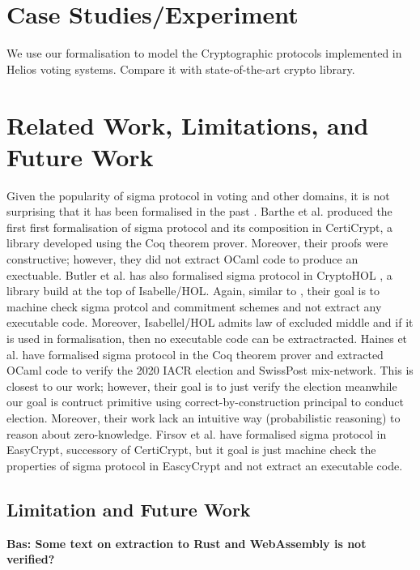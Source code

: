 \documentclass[conference,compsoc]{IEEEtran}
\begin{document}
\section{Case Studies/Experiment}
  We use our formalisation to model the Cryptographic protocols implemented in 
  Helios voting systems. Compare it with state-of-the-art 
  crypto library. 


\section{Related Work, Limitations, and Future Work}
  Given the popularity of sigma protocol in voting 
  and other domains, it is not surprising that it has 
  been formalised in the past \cite{5552642,9519460,
  butler2021formalising,10.1145/3319535.3354247,287095,almeida2010certifying,10221929,
  10.1145/3594735}. Barthe et al. \cite{5552642}  produced the 
  first first formalisation of sigma protocol and its composition in 
  CertiCrypt, a library developed using the Coq theorem prover. 
  Moreover, their proofs were constructive; however, they 
  did not extract OCaml code to produce an exectuable. 
  Butler et al. \cite{ butler2021formalising} has also 
  formalised sigma protocol in CryptoHOL \cite{10.1007/978-3-662-49498-1_20}, a library 
  build at the top of Isabelle/HOL. Again, similar to  \cite{5552642}, 
  their goal is to machine check sigma protcol and commitment schemes 
  and not extract any executable code. Moreover, Isabellel/HOL admits 
  law of excluded middle and if it is used in formalisation, 
  then no executable code can be extractracted. Haines et al. 
  \cite{287095,10.1145/3319535.3354247} have formalised 
  sigma protocol in the Coq theorem prover and extracted OCaml code 
  to verify the 2020 IACR election and SwissPost mix-network. This is 
  closest to our work; however, their goal is to just verify the 
  election meanwhile our goal is contruct primitive using 
  correct-by-construction principal to conduct election. Moreover, 
  their work lack an intuitive way (probabilistic reasoning) 
  to reason about zero-knowledge. Firsov et al. \cite{10221929}
  have formalised sigma protocol in EasyCrypt, successory 
  of CertiCrypt, but it goal is just machine check 
  the properties of sigma protocol in EascyCrypt 
  and not extract an executable code. 

  
  \subsection{Limitation and Future Work}
   \textbf{Bas: Some text on extraction to Rust and WebAssembly is not verified?}\\ 
\end{document}
